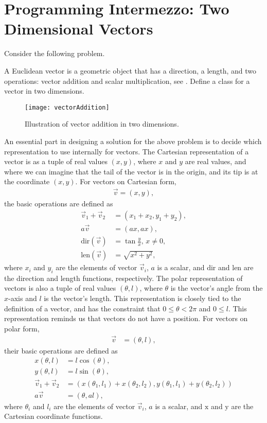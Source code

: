 \section{Programming Intermezzo: Two Dimensional Vectors}
Consider the following problem.
\begin{problem}
  A Euclidean vector is a geometric object that has a direction, a length, and two operations: vector addition and scalar multiplication, see . Define a class for a vector in two dimensions.
\end{problem}
\begin{figure}
  \centering
  \texttt{[image: vectorAddition]}
  \caption{Illustration of vector addition in two dimensions.}
  \label{fig:vectorAddition}
\end{figure}
An essential part in designing a solution for the above problem is to decide which representation to use internally for vectors. The Cartesian representation of a vector is as a tuple of real values $(x,y)$, where $x$ and $y$ are real values, and where we can imagine that the tail of the vector is in the origin, and its tip is at the coordinate $(x,y)$. For vectors on Cartesian form,
\begin{align}
  \vec v = (x,y),
\end{align}
the basic operations are defined as
\begin{align}
  \vec v_1 + \vec v_2 &= (x_1+x_2, y_1+y_2),
  \\a\vec v &= (a x,a x),
  \\\text{dir}(\vec v) &= \tan\frac{y}{x},\, x\neq 0,
  \\\text{len}(\vec v) &= \sqrt{x^2+y^2},
\end{align}
where $x_i$ and $y_i$ are the elements of vector $\vec v_i$, $a$ is a scalar, and $\text{dir}$ and $\text{len}$ are the direction and length functions, respectively. The polar representation of vectors is also a tuple of real values $(\theta, l)$, where $\theta$ is the vector's angle from the $x$-axis and $l$ is the vector's length. This representation is closely tied to the definition of a vector, and has the constraint that $0 \leq \theta < 2\pi$ and $0 \leq l$. This representation reminds us that vectors do not have a position. For vectors on polar form,
\begin{align}
  \vec v &= (\theta,l),
\end{align}
their basic operations are defined as
\begin{align}
  x(\theta,l) &= l\cos(\theta),
  \\y(\theta,l) &= l\sin(\theta),
  \\\vec v_1 + \vec v_2 &= (x(\theta_1,l_1)+x(\theta_2,l_2), y(\theta_1,l_1)+y(\theta_2,l_2))
  \\a\vec v &= (\theta,a l),
\end{align}
where $\theta_i$ and $l_i$ are the elements of vector $\vec v_i$, $a$ is a scalar, and $\text{x}$ and $\text{y}$ are the Cartesian coordinate functions.

